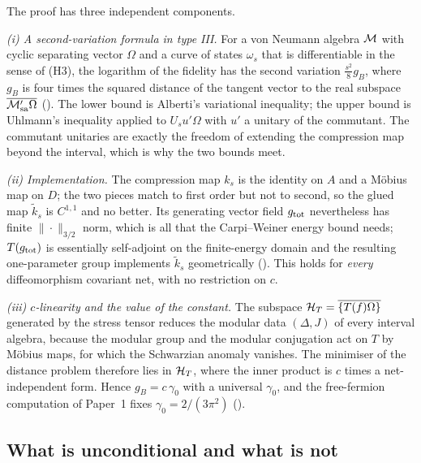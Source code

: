 The proof has three independent components.

\emph{(i) A second-variation formula in type III.}  For a von Neumann algebra $\mathcal M$ with
cyclic separating vector $\Omega$ and a curve of states $\omega_s$ that is differentiable
in the sense of (H3), the logarithm of the fidelity has the second variation
$\frac{s^2}{8}g_B$, where $g_B$ is four times the squared distance of the tangent vector to
the real subspace $\overline{\mathcal M'_{\rm sa}\Omega}$ ().  The lower bound is
Alberti's variational inequality; the upper bound is Uhlmann's inequality applied to
$U_s u'\Omega$ with $u'$ a unitary of the commutant.  The commutant unitaries are exactly
the freedom of extending the compression map beyond the interval, which is why the two
bounds meet.

\emph{(ii) Implementation.}  The compression map $k_s$ is the identity on $A$ and a
M\"obius map on $D$; the two pieces match to first order but not to second, so the glued
map $\tilde k_s$ is $C^{1,1}$ and no better.  Its generating vector field $g_{\rm tot}$
nevertheless has finite $\|\cdot\|_{3/2}$ norm, which is all that the Carpi--Weiner energy
bound \cite{CW} needs; $T(g_{\rm tot})$ is essentially self-adjoint on the finite-energy
domain and the resulting one-parameter group implements $\tilde k_s$ geometrically
().  This holds for \emph{every} diffeomorphism covariant net, with no
restriction on $c$.

\emph{(iii) $c$-linearity and the value of the constant.}  The subspace
$\mathcal H_T=\overline{\{T(f)\Omega\}}$ generated by the stress tensor reduces the modular data
$(\Delta,J)$ of every interval algebra, because the modular group and the modular
conjugation act on $T$ by M\"obius maps, for which the Schwarzian anomaly vanishes.  The
minimiser of the distance problem therefore lies in $\mathcal H_T$, where the inner product is $c$
times a net-independent form.  Hence $g_B=c\,\gamma_0$ with a universal $\gamma_0$, and the
free-fermion computation of Paper~1 fixes $\gamma_0=2/(3\pi^2)$ ().

\subsection*{What is unconditional and what is not}


